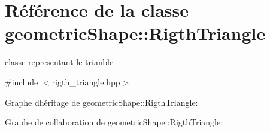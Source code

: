 \hypertarget{classgeometric_shape_1_1_rigth_triangle}{}\section{Référence de la classe geometric\+Shape\+:\+:Rigth\+Triangle}
\label{classgeometric_shape_1_1_rigth_triangle}


classe representant le trianble  




{\ttfamily \#include $<$rigth\+\_\+triangle.\+hpp$>$}



Graphe d\textquotesingle{}héritage de geometric\+Shape\+:\+:Rigth\+Triangle\+:


Graphe de collaboration de geometric\+Shape\+:\+:Rigth\+Triangle\+:
